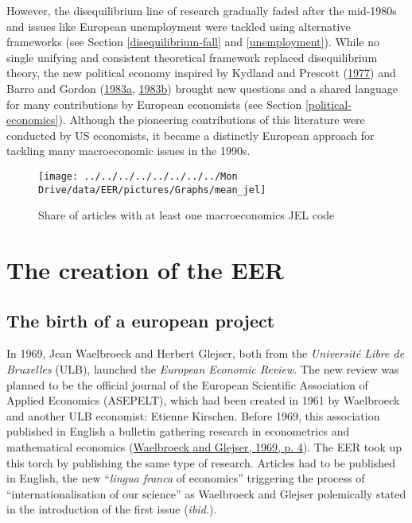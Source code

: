 \documentclass[
  12pt,
  onecolumn]{article}
\begin{document}
However, the disequilibrium line of research gradually faded after the mid-1980s and issues like European unemployment were tackled using alternative frameworks (see Section \ref{disequilibrium-fall} and \ref{unemployment}). While no single unifying and consistent theoretical framework replaced disequilibrium theory, the new political economy inspired by Kydland and Prescott (\protect\hyperlink{ref-kydland1977}{1977}) and Barro and Gordon (\protect\hyperlink{ref-barro1983}{1983a}, \protect\hyperlink{ref-barro1983c}{1983b}) brought new questions and a shared language for many contributions by European economists (see Section \ref{political-economics}). Although the pioneering contributions of this literature were conducted by US economists, it became a distinctly European approach for tackling many macroeconomic issues in the 1990s.

\begin{figure}[H]

{\centering \texttt{[image: ../../../../../../../../Mon Drive/data/EER/pictures/Graphs/mean\_jel]} 

}

\caption{Share of articles with at least one macroeconomics JEL code}\label{fig:plot-jel}
\end{figure}

\hypertarget{EER-creation}{%
\section{The creation of the EER}\label{EER-creation}}

\hypertarget{the-birth-of-a-european-project}{%
\subsection{The birth of a european project}\label{the-birth-of-a-european-project}}

In 1969, Jean Waelbroeck and Herbert Glejser, both from the \emph{Université Libre de Bruxelles} (ULB), launched the \emph{European Economic Review}. The new review was planned to be the official journal of the European Scientific Association of Applied Economics (ASEPELT), which had been created in 1961 by Waelbroeck and another ULB economist: Etienne Kirschen. Before 1969, this association published in English a bulletin gathering research in econometrics and mathematical economics (\protect\hyperlink{ref-waelbroeck1969}{Waelbroeck and Glejser, 1969, p. 4}). The EER took up this torch by publishing the same type of research. Articles had to be published in English, the new ``\emph{lingua franca} of economics'' triggering the process of ``internationalisation of our science'' as Waelbroeck and Glejser polemically stated in the introduction of the first issue (\emph{ibid.}).
\end{document}
